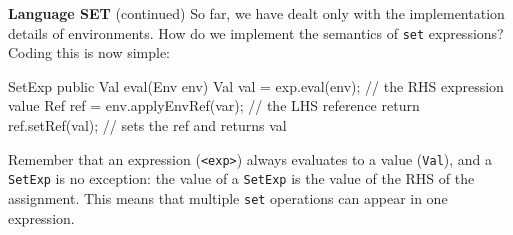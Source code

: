\begin{minipage}[t]{\sw}
\slidenumber
\LARGE
{\bf Language SET} (continued)\exx
{\Large
\emm{}\exx
}
So far, we have dealt only with the implementation details
of environments.  How do we implement the semantics
of \verb'set' expressions?
Coding this is now simple:
{\Large
\begin{qv}
SetExp
    public Val eval(Env env) {
        Val val = exp.eval(env); // the RHS expression value
        Ref ref = env.applyEnvRef(var); // the LHS reference
        return ref.setRef(val);  // sets the ref and returns val
    }
\end{qv}
}
Remember that an expression (\verb'<exp>') always evaluates
to a value (\verb'Val'), and a \verb'SetExp' is no exception:
the value of a \verb'SetExp' is the value
of the RHS of the assignment.
This means that multiple \verb'set' operations can appear
in one expression.
\end{minipage}
\clearpage
